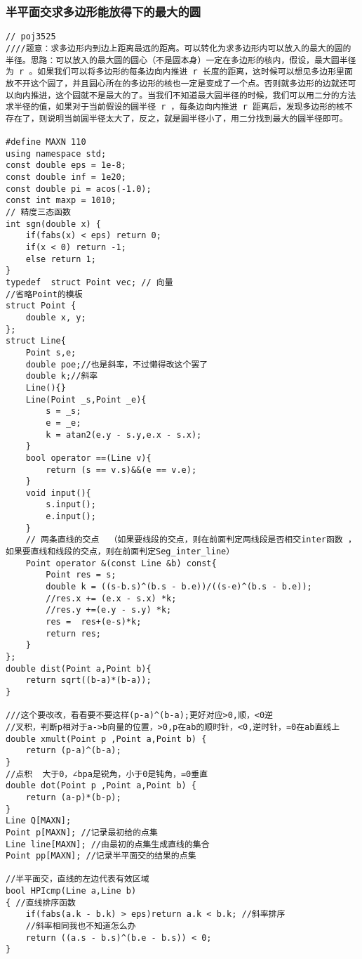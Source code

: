 \subsubsection{半平面交求多边形能放得下的最大的圆}
\begin{lstlisting}
// poj3525
////题意：求多边形内到边上距离最远的距离。可以转化为求多边形内可以放入的最大的圆的半径。思路：可以放入的最大圆的圆心（不是圆本身）一定在多边形的核内，假设，最大圆半径为 r 。如果我们可以将多边形的每条边向内推进 r 长度的距离，这时候可以想见多边形里面放不开这个圆了，并且圆心所在的多边形的核也一定是变成了一个点。否则就多边形的边就还可以向内推进，这个圆就不是最大的了。当我们不知道最大圆半径的时候，我们可以用二分的方法求半径的值，如果对于当前假设的圆半径 r ，每条边向内推进 r 距离后，发现多边形的核不存在了，则说明当前圆半径太大了，反之，就是圆半径小了，用二分找到最大的圆半径即可。

#define MAXN 110
using namespace std;
const double eps = 1e-8;
const double inf = 1e20;
const double pi = acos(-1.0);
const int maxp = 1010;
// 精度三态函数
int sgn(double x) {
	if(fabs(x) < eps) return 0;
	if(x < 0) return -1;
	else return 1;
}
typedef  struct Point vec; // 向量
//省略Point的模板
struct Point {
	double x, y;
};
struct Line{
	Point s,e;
	double poe;//也是斜率，不过懒得改这个罢了
	double k;//斜率
	Line(){}
	Line(Point _s,Point _e){
		s = _s;
		e = _e;
		k = atan2(e.y - s.y,e.x - s.x);
	}
	bool operator ==(Line v){
		return (s == v.s)&&(e == v.e);
	}
	void input(){
		s.input();
		e.input();
	}
	// 两条直线的交点  （如果要线段的交点，则在前面判定两线段是否相交inter函数 ，如果要直线和线段的交点，则在前面判定Seg_inter_line）
	Point operator &(const Line &b) const{
		Point res = s;
		double k = ((s-b.s)^(b.s - b.e))/((s-e)^(b.s - b.e));
		//res.x += (e.x - s.x) *k;
		//res.y +=(e.y - s.y) *k;
		res =  res+(e-s)*k;
		return res;
	}
};
double dist(Point a,Point b){
	return sqrt((b-a)*(b-a));
}

///这个要改改，看看要不要这样(p-a)^(b-a);更好对应>0,顺，<0逆
//叉积，判断p相对于a->b向量的位置，>0,p在ab的顺时针，<0,逆时针，=0在ab直线上
double xmult(Point p ,Point a,Point b) {
	return (p-a)^(b-a);
}
//点积  大于0，∠bpa是锐角，小于0是钝角，=0垂直
double dot(Point p ,Point a,Point b) {
	return (a-p)*(b-p);
}
Line Q[MAXN];
Point p[MAXN]; //记录最初给的点集
Line line[MAXN]; //由最初的点集生成直线的集合
Point pp[MAXN]; //记录半平面交的结果的点集

//半平面交，直线的左边代表有效区域
bool HPIcmp(Line a,Line b)
{ //直线排序函数
	if(fabs(a.k - b.k) > eps)return a.k < b.k; //斜率排序
	//斜率相同我也不知道怎么办
	return ((a.s - b.s)^(b.e - b.s)) < 0;
}


\end{lstlisting}

